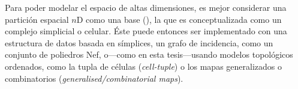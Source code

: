 {Para poder modelar el espacio de altas dimensiones, es mejor considerar una partición espacial $n$D como una base (), la que es conceptualizada como un complejo simplicial o celular.
Éste puede entonces ser implementado con una estructura de datos basada en símplices, un grafo de incidencia, como un conjunto de poliedros Nef, o---como en esta tesis---usando modelos topológicos ordenados, como la tupla de células (\emph{cell-tuple}) o los mapas generalizados o combinatorios (\emph{generalised/combinatorial maps}).

}
